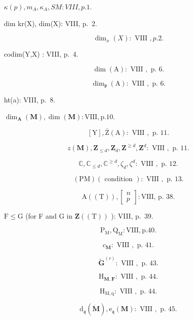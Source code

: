 

\(\kappa(p), m_A, \kappa_A, SM: VIII, p. 1.\)

dim kr(X), dim(X): VIII, p.~2.

\[
\dim_ {x} (X): \text { VIII }, p. 2.
\]

codim(Y,X) : VIII, p.~4.

\[
\dim (\mathrm{A}): \text { VIII }, \text { p. } 6.
\]

\[
\dim_ {\mathfrak {p}} (\mathrm{A}): \text { VIII }, \text { p. } 6.
\]

ht(a): VIII, p.~8.

\(\dim_{\mathbf{A}}(\mathbf{M}), \dim(\mathbf{M}) : \mathrm{VIII}, \mathrm{p.} 10.\)

\[
[ \mathrm{Y} ], \bar {\mathrm{Z}} (\mathrm{A}): \text { VIII }, \text { p. } 11.
\]

\[
z (\mathbf {M}), \mathbf {Z} _ {\leqslant d}, \mathbf {Z} _ {d}, \mathbf {Z} ^ {\geqslant d}, \mathbf {Z} ^ {d}: \text { VIII }, \text { p. } 11.
\]

\[
\mathbb {C}, \mathbb {C} _ {\leqslant d}, \mathbb {C} ^ {\geqslant d}, \zeta_ {d}, \zeta^ {d}: \text { VIII }, \text { p. } 12.
\]

\[
(\mathrm{PM}) (\text { condition }): \text { VIII }, \text { p. } 13.
\]

\[
\mathrm{A} ((\mathrm{T})), \left[ \begin{array}{c} n \\ p \end{array} \right]: \text {VIII, p. 38.}
\]

\(\mathrm{F} \leqslant \mathrm{G}\) (for F and G in \(\mathbf{Z}((\mathrm{T}))\) ): VIII, p.~39.

\[
\mathrm{P} _ {\mathrm{M}}, \mathrm{Q} _ {\mathrm{M}}: \mathrm{VIII}, \text {p.} 40.
\]

\[
c _ {\mathbf {M}}: \text { VIII }, \text { p. } 41.
\]

\[
\tilde {\mathbf {G}} ^ {(r)}: \text { VIII }, \text { p. } 43.
\]

\[
\mathrm{H} _ {\mathbf {M}, \mathbf {F}}: \text { VIII }, \text { p. } 44.
\]

\[
\mathrm{H} _ {\mathrm{M}, \mathrm{q}}: \text { VIII }, \text { p. } 44.
\]

\[
\mathrm{d} _ {\mathfrak {q}} (\dot {\mathbf {M}}), \mathrm{e} _ {\mathfrak {q}} (\mathbf {M}): \text { VIII }, \text { p. } 45.
\]

